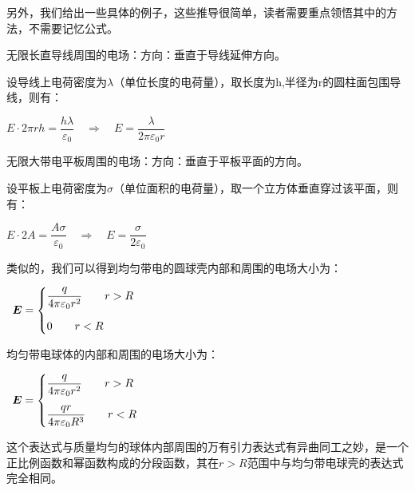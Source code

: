 另外，我们给出一些具体的例子，这些推导很简单，读者需要重点领悟其中的方法，不需要记忆公式。
\begin{Itemize}
    \item 无限长直导线周围的电场：方向：垂直于导线延伸方向。\par
    设导线上电荷密度为$\lambda$（单位长度的电荷量），取长度为h,半径为r的圆柱面包围导线，则有：
    \begin{center}
        $E\cdot 2\pi rh=\dfrac{h\lambda}{\varepsilon_0}\quad\Rightarrow\quad E=\dfrac{\lambda}{2\pi \varepsilon_0 r}$
    \end{center}
    \item 无限大带电平板周围的电场：方向：垂直于平板平面的方向。\par
    设平板上电荷密度为$\sigma$（单位面积的电荷量），取一个立方体垂直穿过该平面，则有：
    \begin{center}
         $E\cdot 2A=\dfrac{A\sigma}{\varepsilon_0}\quad\Rightarrow\quad E=\dfrac{\sigma}{2\varepsilon_0}$
    \end{center}
    \item 类似的，我们可以得到均匀带电的圆球壳内部和周围的电场大小为：
    \begin{center}
        $\begin{array}{c}
        \vec{E}= 
        \begin{cases}
            \vspace{3mm}
            \dfrac{q}{4\pi \varepsilon_0 r^2}\qquad r>R\\
            0\qquad r<R\\
        \end{cases} 
        \end{array}$
    \end{center}
    \item 均匀带电球体的内部和周围的电场大小为：
    \begin{center}
        $\begin{array}{c}
        \vec{E}= 
        \begin{cases}
            \vspace{3mm}
            \dfrac{q}{4\pi \varepsilon_0 r^2}\qquad r>R\\
            \dfrac{qr}{4\pi \varepsilon_0 R^3}\qquad r<R\\
        \end{cases} 
        \end{array}$
    \end{center}
    这个表达式与质量均匀的球体内部周围的万有引力表达式有异曲同工之妙，是一个正比例函数和幂函数构成的分段函数，其在$r>R$范围中与均匀带电球壳的表达式完全相同。
\end{Itemize}

